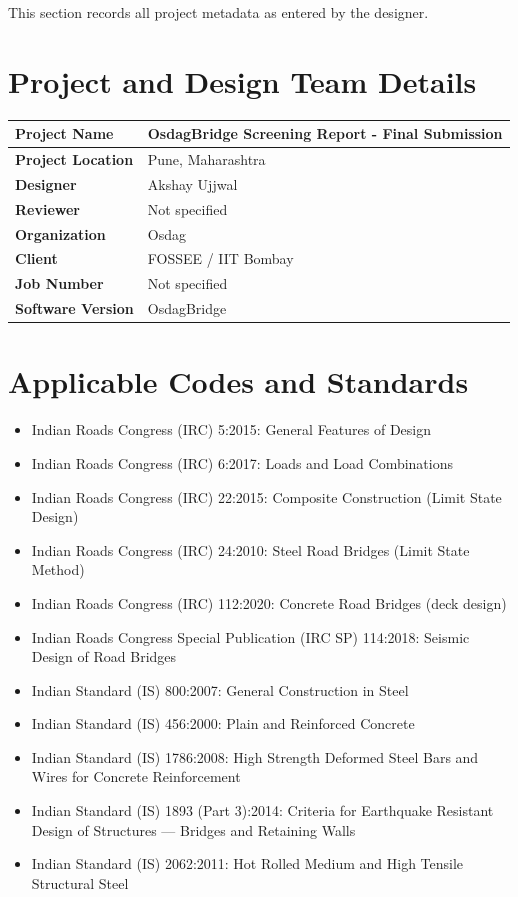 \documentclass[12pt,a4paper]{report}
\numberwithin{table}{chapter}
\numberwithin{figure}{chapter}
\begin{document}
This section records all project metadata as entered by the designer.

\section{Project and Design Team Details}
\label{sec:project-details}

\begin{tabular}{|L{5.5cm}|L{8.5cm}|}
\hline
\textbf{Project Name} & OsdagBridge Screening Report - Final Submission \\
\hline
\textbf{Project Location} & Pune, Maharashtra \\
\hline
\textbf{Designer} & Akshay Ujjwal \\
\hline
\textbf{Reviewer} & Not specified \\
\hline
\textbf{Organization} & Osdag \\
\hline
\textbf{Client} & FOSSEE / IIT Bombay \\
\hline
\textbf{Job Number} & Not specified \\
\hline
\textbf{Software Version} & OsdagBridge \\
\hline
\end{tabular}


\section{Applicable Codes and Standards}
\label{sec:codes}

\begin{itemize}
\item Indian Roads Congress (IRC) 5:2015: General Features of Design
\item Indian Roads Congress (IRC) 6:2017: Loads and Load Combinations
\item Indian Roads Congress (IRC) 22:2015: Composite Construction (Limit State Design)
\item Indian Roads Congress (IRC) 24:2010: Steel Road Bridges (Limit State Method)
\item Indian Roads Congress (IRC) 112:2020: Concrete Road Bridges (deck design)
\item Indian Roads Congress Special Publication (IRC SP) 114:2018: Seismic Design of Road Bridges
\item Indian Standard (IS) 800:2007: General Construction in Steel
\item Indian Standard (IS) 456:2000: Plain and Reinforced Concrete
\item Indian Standard (IS) 1786:2008: High Strength Deformed Steel Bars and Wires for Concrete Reinforcement
\item Indian Standard (IS) 1893 (Part 3):2014: Criteria for Earthquake Resistant Design of Structures --- Bridges and Retaining Walls
\item Indian Standard (IS) 2062:2011: Hot Rolled Medium and High Tensile Structural Steel
\end{itemize}
\end{document}
